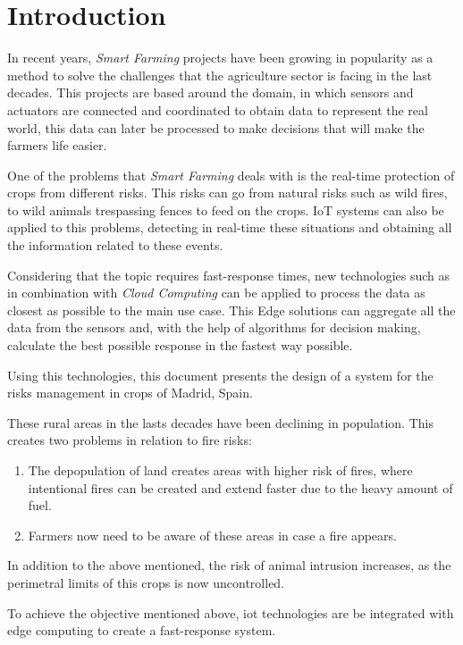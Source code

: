 \section{Introduction}

In recent years, \textit{Smart Farming} projects have been growing in popularity as a method to solve the challenges that the agriculture sector is facing in the last decades. 
This projects are based around the  domain, in which sensors and actuators are connected and coordinated to obtain data to represent the real world, this data can 
later be processed to make decisions that will make the farmers life easier.

One of the problems that \textit{Smart Farming} deals with is the real-time protection of crops from different risks. This risks can go from natural 
risks such as wild fires, to wild animals trespassing fences to feed on the crops. IoT systems can also be applied to this problems, detecting in real-time 
these situations and obtaining all the information related to these events. 

Considering that the topic requires fast-response times, new technologies such as  in combination with \textit{Cloud Computing} can be applied to 
process the data as closest as possible to the main use case. This Edge solutions can aggregate all the data from the sensors and, with the help of 
algorithms for decision making, calculate the best possible response in the fastest way possible.


Using this technologies, this document presents the design of a system for the risks management in crops of Madrid, Spain. 

These rural areas in the lasts decades have been declining in population. This creates two problems in relation to fire risks:
\begin{enumerate}
    \item The depopulation of land creates areas with higher risk of fires\cite{Yanosolo}, where intentional fires can be created and extend faster due to the heavy amount of fuel.
    \item Farmers now need to be aware of these areas in case a fire appears.
\end{enumerate}

In addition to the above mentioned, the risk of animal intrusion increases\cite{importanciacazaEspana}, as the perimetral limits of this crops is now uncontrolled.

To achieve the objective mentioned above, \acrshort{iot} technologies are be integrated with edge computing to create a fast-response system.
